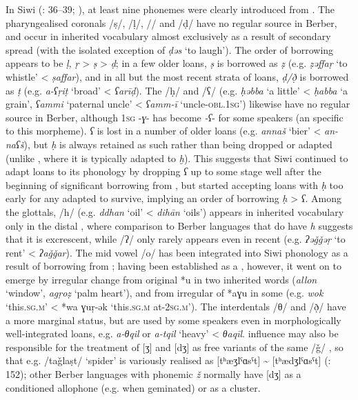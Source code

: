 \documentclass[output=paper]{langsci/langscibook}
\begin{document}
In Siwi (\citealt{Souag2013book}: 36–39; \citealt{SouagvanPutten2016}), at least nine phonemes were clearly introduced from .  The pharyngealised coronals /ṣ/, /ḷ/, /\R/ and /ḍ/ have no regular source in Berber, and occur in inherited vocabulary almost exclusively as a result of secondary  spread (with the isolated exception of \textit{ḍəs} `to laugh').  The order of borrowing appears to be \textit{ḷ,} \textit{ṛ} > \textit{ṣ} > \textit{ḍ}; in a few older loans,  \textit{ṣ} is borrowed as \textit{ẓ} (e.g. \textit{ẓəffaṛ} `to whistle' < \textit{ṣaffar}), and in all but the most recent strata of loans,  \textit{ḍ/ð̣} is borrowed as \textit{ṭ} (e.g. \textit{a-ʕṛiṭ} `broad' < \textit{ʕarīḍ}).  The  /ḥ/ and /ʕ/ (e.g. \textit{ḥəbba} `a little' < \textit{ḥabba} `a grain', \textit{ʕammi} `paternal uncle' < \textit{ʕamm-ī} `uncle-\textsc{obl.1sg}') likewise have no regular source in Berber, although 1\textsc{sg} -\textit{ɣ}{}- has become \textit{{}-ʕ}{}- for some speakers (an  specific to this morpheme). \textit{ʕ} is lost in a number of older loans (e.g. \textit{annaš} `bier' < \textit{an-naʕš}), but \textit{ḥ} is always retained as such rather than being dropped or adapted (unlike , where it is typically adapted to \textit{ḫ}).  This suggests that Siwi continued to adapt  loans to its phonology by dropping \textit{ʕ} up to some stage well after the beginning of significant borrowing from , but started accepting  loans with \textit{ḥ} too early for any adapted to survive, implying an order of borrowing \textit{ḥ} > \textit{ʕ}. Among the glottals, /h/ (e.g. \textit{ddhan} `oil' < \textit{dihān} `oils') appears in inherited vocabulary only in the distal , where comparison to Berber languages that do have \textit{h} suggests that it is excrescent, while /ʔ/ only rarely appears even in recent  (e.g. \textit{ʔəǧǧəṛ} `to rent' < \textit{ʔaǧǧar}). The mid vowel /o/ has been integrated into Siwi phonology as a result of borrowing from ; having been established as a , however, it went on to emerge by irregular change from original {*u} in two inherited words (\textit{allon} `window', \textit{agṛoẓ} `palm heart'), and from irregular  of {*aɣu} in some  (e.g. \textit{wok} `this\textsc{.sg.m}' < *wa ɣuṛ-ək `this.\textsc{sg.m} at-\textsc{2sg.m')}. The interdentals /θ/ and /ð̣/ have a more marginal status, but are used by some speakers even in morphologically well-integrated loans, e.g. \textit{a-θqil} or \textit{a-tqil} `heavy' < \textit{θaqīl}.  influence may also be responsible for the treatment of [ʒ] and [dʒ] as free variants of the same  /ǧ/ \citep{Vycichl2005}, so that e.g. /taǧlaṣt/ `spider' is variously realised as [tʰæʒlˤɑsˤt] {\textasciitilde} [tʰædʒlˤɑsˤt] (\citealt{Naumann2012}: 152); other Berber languages with phonemic \textit{ž} normally have [dʒ] as a conditioned allophone (e.g. when geminated) or as a cluster.
\end{document}
